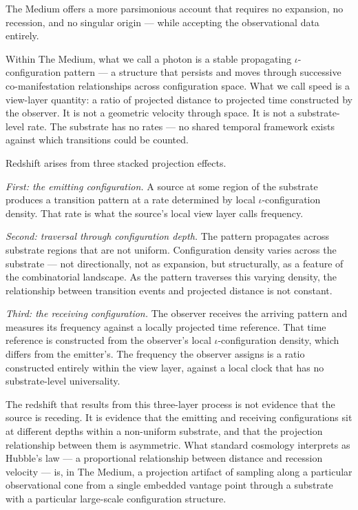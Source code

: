 \documentclass[11pt,letterpaper]{article}
\begin{document}
The Medium offers a more parsimonious account that requires no expansion, no recession, and no singular origin --- while accepting the observational data entirely.

Within The Medium, what we call a photon is a stable propagating \(\iota\)-configuration pattern --- a structure that persists and moves through successive co-manifestation relationships across configuration space. What we call speed is a view-layer quantity: a ratio of projected distance to projected time constructed by the observer. It is not a geometric velocity through space. It is not a substrate-level rate. The substrate has no rates --- no shared temporal framework exists against which transitions could be counted.

Redshift arises from three stacked projection effects.

\emph{First: the emitting configuration.} A source at some region of the substrate produces a transition pattern at a rate determined by local \(\iota\)-configuration density. That rate is what the source's local view layer calls frequency.

\emph{Second: traversal through configuration depth.} The pattern propagates across substrate regions that are not uniform. Configuration density varies across the substrate --- not directionally, not as expansion, but structurally, as a feature of the combinatorial landscape. As the pattern traverses this varying density, the relationship between transition events and projected distance is not constant.

\emph{Third: the receiving configuration.} The observer receives the arriving pattern and measures its frequency against a locally projected time reference. That time reference is constructed from the observer's local \(\iota\)-configuration density, which differs from the emitter's. The frequency the observer assigns is a ratio constructed entirely within the view layer, against a local clock that has no substrate-level universality.

The redshift that results from this three-layer process is not evidence that the source is receding. It is evidence that the emitting and receiving configurations sit at different depths within a non-uniform substrate, and that the projection relationship between them is asymmetric. What standard cosmology interprets as Hubble's law --- a proportional relationship between distance and recession velocity --- is, in The Medium, a projection artifact of sampling along a particular observational cone from a single embedded vantage point through a substrate with a particular large-scale configuration structure.
\end{document}
